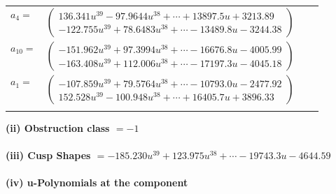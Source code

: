 \documentclass[1p]{elsarticle_modified}
\theoremstyle{definition}
\begin{document}
\begin{tabular}{m{7pt} m{180pt} m{7pt} m{180pt} }
\flushright $a_{4}=$&$\begin{pmatrix}136.341 u^{39}-97.9644 u^{38}+\cdots+13897.5 u+3213.89\\-122.755 u^{39}+78.6483 u^{38}+\cdots-13489.8 u-3244.38\end{pmatrix}$ \\
\flushright $a_{10}=$&$\begin{pmatrix}-151.962 u^{39}+97.3994 u^{38}+\cdots-16676.8 u-4005.99\\-163.408 u^{39}+112.006 u^{38}+\cdots-17197.3 u-4045.18\end{pmatrix}$ \\
\flushright $a_{1}=$&$\begin{pmatrix}-107.859 u^{39}+79.5764 u^{38}+\cdots-10793.0 u-2477.92\\152.528 u^{39}-100.948 u^{38}+\cdots+16405.7 u+3896.33\end{pmatrix}$\\&\end{tabular}
\flushleft \textbf{(ii) Obstruction class $= -1$}\\~\\
\flushleft \textbf{(iii) Cusp Shapes $= -185.230 u^{39}+123.975 u^{38}+\cdots-19743.3 u-4644.59$}\\~\\
\newpage\renewcommand{\arraystretch}{1}
\flushleft \textbf{(iv) u-Polynomials at the component}\newline \\
\end{document}

